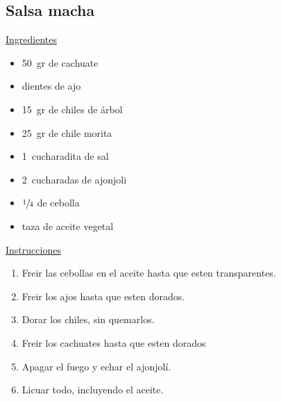 \subsection{Salsa macha}

\underline{Ingredientes}
\begin{itemize}
\item \SI{50}{gr} de cachuate
\item {} dientes de ajo
\item \SI{15}{gr} de chiles de árbol
\item \SI{25}{gr} de chile morita
\item \SI{1}{cucharadita} de sal
\item \SI{2}{cucharadas} de ajonjoli
\item \Sim $\sfrac{1}{4}$ de cebolla
\item {} taza de aceite vegetal
\end{itemize}

\underline{Instrucciones}
\begin{enumerate}
\item Freir las cebollas en el aceite hasta que esten transparentes.
\item Freir los ajos hasta que esten dorados.
\item Dorar los chiles, sin quemarlos.
\item Freir los cachuates hasta que esten dorados
\item Apagar el fuego y echar el ajonjolí.
\item Licuar todo, incluyendo el aceite. 
\end{enumerate}
